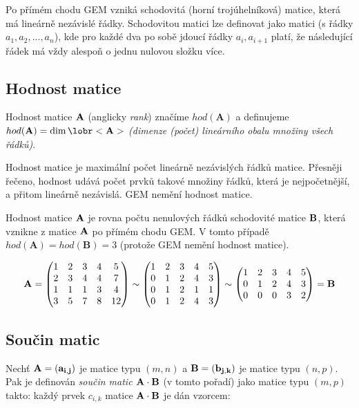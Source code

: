 Po přímém chodu GEM vzniká schodovitá (horní trojúhelníková) matice, která má lineárně nezávislé řádky. Schodovitou matici lze definovat jako matici (s řádky $a_1, a_2,..., a_n$), kde pro každé dva po sobě jdoucí řádky $a_i, a_{i+1}$ platí, že následující řádek má vždy alespoň o jednu nulovou složku více.

\subsection*{Hodnost matice}

 Hodnost matice $\bf A$ (anglicky {\em rank\/}) značíme $hod(\textbf{A})$ a
definujeme $ hod(\textbf{A}) = \dim\lobr<\textbf{A}>$ \textit{(dimenze (počet) lineárního obalu množiny všech řádků)}.

Hodnost matice je maximální počet lineárně nezávislých řádků matice. Přesněji řečeno, hodnost udává počet prvků takové množiny řádků, která je nejpočetnější, a přitom lineárně nezávislá. GEM nemění hodnost matice.

Hodnost matice $\bf A$ je rovna počtu nenulových řádků schodovité matice $\bf B$, která vznikne z matice $\bf A$ po přímém chodu GEM. V tomto případě $hod(\textbf{A}) = hod(\textbf{B}) = 3$ (protože GEM nemění hodnost matice).

$$
\bf A = \begin{pmatrix}
  1 & 2 & 3 & 4 & 5 \\
  2 & 3 & 4 & 4 & 7 \\
  1 & 1 & 1 & 3 & 4 \\
  3 & 5 & 7 & 8 & 12
 \end{pmatrix}
\sim
\begin{pmatrix}
  1 & 2 & 3 & 4 & 5 \\
  0 & 1 & 2 & 4 & 3 \\
  0 & 1 & 2 & 1 & 1 \\
  0 & 1 & 2 & 4 & 3
 \end{pmatrix}
\sim
\begin{pmatrix}
  1 & 2 & 3 & 4 & 5 \\
  0 & 1 & 2 & 4 & 3 \\
  0 & 0 & 0 & 3 & 2
 \end{pmatrix} = \bf B
$$


\subsection*{Součin matic}

 Nechť $\bf A=(a_{i,j})$ je matice typu $(m,n)$ a $\bf B=(b_{j,k})$ je matice
typu $(n,p)$. Pak je definován {\em součin matic $\bf A\cdot\bf B$} 
(v tomto pořadí) jako matice typu $(m,p)$ takto: 
každý prvek $c_{i,k}$ matice $\bf A\cdot\bf B$ je dán vzorcem:


